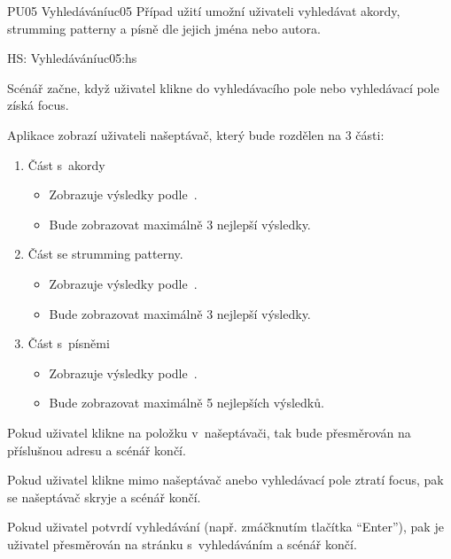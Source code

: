 \begin{usecase}{PU05 Vyhledávání}{uc05}
    Případ užití umožní uživateli vyhledávat akordy, strumming patterny a písně dle jejich jména nebo autora.

    \begin{scenario}{HS: Vyhledávání}{uc05:hs}
        \item Scénář začne, když uživatel klikne do vyhledávacího pole nebo vyhledávací pole získá focus.
        \item Aplikace zobrazí uživateli našeptávač, který bude rozdělen na 3 části:
        \begin{enumerate}
            \item Část s~akordy
                  \begin{itemize}
                      \item Zobrazuje výsledky podle~.
                      \item Bude zobrazovat maximálně 3 nejlepší výsledky.
                  \end{itemize}
            \item Část se strumming patterny.
                  \begin{itemize}
                      \item Zobrazuje výsledky podle~.
                      \item Bude zobrazovat maximálně 3 nejlepší výsledky.
                  \end{itemize}
            \item Část s~písněmi
                  \begin{itemize}
                      \item Zobrazuje výsledky podle~.
                      \item Bude zobrazovat maximálně 5 nejlepších výsledků.
                  \end{itemize}
        \end{enumerate}
        \item Pokud uživatel klikne na položku v~našeptávači, tak bude přesměrován na příslušnou adresu a scénář končí.
        \item Pokud uživatel klikne mimo našeptávač anebo vyhledávací pole ztratí focus, pak se našeptávač skryje a scénář končí.
        \item Pokud uživatel potvrdí vyhledávání (např. zmáčknutím tlačítka \enquote{Enter}), pak je uživatel přesměrován na stránku s~vyhledáváním a scénář končí.
    \end{scenario}


\end{usecase}
